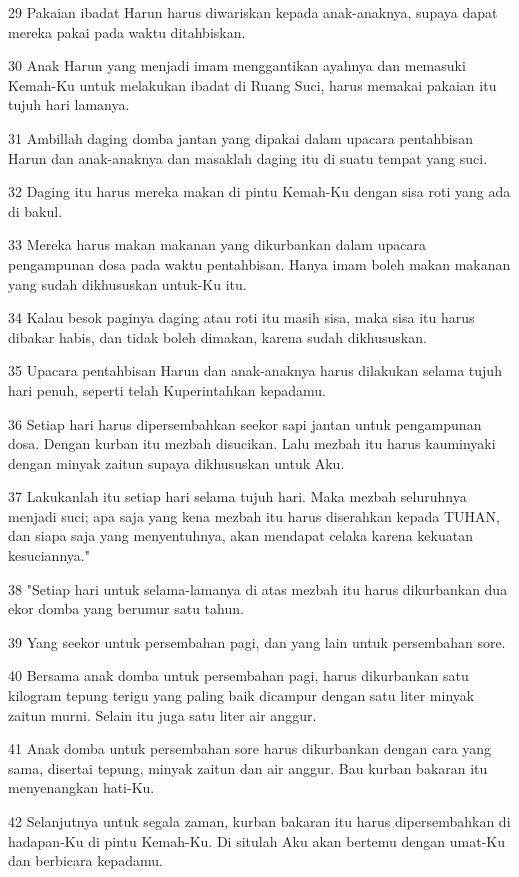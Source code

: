 \par 29 Pakaian ibadat Harun harus diwariskan kepada anak-anaknya, supaya dapat mereka pakai pada waktu ditahbiskan.
\par 30 Anak Harun yang menjadi imam menggantikan ayahnya dan memasuki Kemah-Ku untuk melakukan ibadat di Ruang Suci, harus memakai pakaian itu tujuh hari lamanya.
\par 31 Ambillah daging domba jantan yang dipakai dalam upacara pentahbisan Harun dan anak-anaknya dan masaklah daging itu di suatu tempat yang suci.
\par 32 Daging itu harus mereka makan di pintu Kemah-Ku dengan sisa roti yang ada di bakul.
\par 33 Mereka harus makan makanan yang dikurbankan dalam upacara pengampunan dosa pada waktu pentahbisan. Hanya imam boleh makan makanan yang sudah dikhususkan untuk-Ku itu.
\par 34 Kalau besok paginya daging atau roti itu masih sisa, maka sisa itu harus dibakar habis, dan tidak boleh dimakan, karena sudah dikhususkan.
\par 35 Upacara pentahbisan Harun dan anak-anaknya harus dilakukan selama tujuh hari penuh, seperti telah Kuperintahkan kepadamu.
\par 36 Setiap hari harus dipersembahkan seekor sapi jantan untuk pengampunan dosa. Dengan kurban itu mezbah disucikan. Lalu mezbah itu harus kauminyaki dengan minyak zaitun supaya dikhususkan untuk Aku.
\par 37 Lakukanlah itu setiap hari selama tujuh hari. Maka mezbah seluruhnya menjadi suci; apa saja yang kena mezbah itu harus diserahkan kepada TUHAN, dan siapa saja yang menyentuhnya, akan mendapat celaka karena kekuatan kesuciannya."
\par 38 "Setiap hari untuk selama-lamanya di atas mezbah itu harus dikurbankan dua ekor domba yang berumur satu tahun.
\par 39 Yang seekor untuk persembahan pagi, dan yang lain untuk persembahan sore.
\par 40 Bersama anak domba untuk persembahan pagi, harus dikurbankan satu kilogram tepung terigu yang paling baik dicampur dengan satu liter minyak zaitun murni. Selain itu juga satu liter air anggur.
\par 41 Anak domba untuk persembahan sore harus dikurbankan dengan cara yang sama, disertai tepung, minyak zaitun dan air anggur. Bau kurban bakaran itu menyenangkan hati-Ku.
\par 42 Selanjutnya untuk segala zaman, kurban bakaran itu harus dipersembahkan di hadapan-Ku di pintu Kemah-Ku. Di situlah Aku akan bertemu dengan umat-Ku dan berbicara kepadamu.
